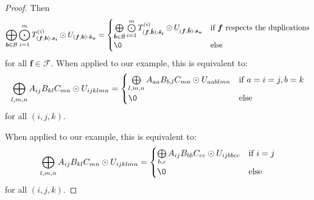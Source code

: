 \begin{proof}
    Then
    $$\bigoplus\limits_{\bm{b} \in \mathcal{B}} \bigodot\limits_{i = 1}^{m} T^{(i)}_{(\bm{f}, \bm{b}):\bm{s_i}} \odot U_{(\bm{f}, \bm{b}):\bm{\hat{s}_u}}
        = \begin{cases}
            \bigoplus\limits_{\bm{\hat{b}} \in \mathcal{\hat{B}}} \bigodot\limits_{i = 1}^{m} T^{(i)}_{(\bm{f}, \bm{\hat{b}}):\bm{\check{s}_i}} \odot U_{(\bm{f}, \bm{\hat{b}}):\bm{s_u}} & \text{if } \bm{f} \text{ respects the duplications} \\
            \0                                                                                                                                                                            & \text{else}
        \end{cases}$$
    for all $\bm{f} \in \mathcal{F}$.
    When applied to our example, this is equivalent to:
    $$\bigoplus\limits_{l, m, n} A_{ij} B_{kl} C_{mn} \odot U_{ijklmn}
        = \begin{cases}
            \bigoplus\limits_{l, m, n} A_{aa} B_{b,l} C_{mn} \odot U_{aablmn} & \text{if } a = i = j, b = k \\
            \0                                                                & \text{else}
        \end{cases}$$
    for all $(i,j,k)$.

    When applied to our example, this is equivalent to:
    $$\bigoplus\limits_{l, m, n} A_{ij} B_{kl} C_{mn} \odot U_{ijklmn}
        = \begin{cases}
            \bigoplus\limits_{b, c} A_{ij} B_{bb} C_{cc} \odot U_{ijbbcc} & \text{if } i = j \\
            \0                                                            & \text{else}
        \end{cases}$$
    for all $(i,j,k)$.


\end{proof}
